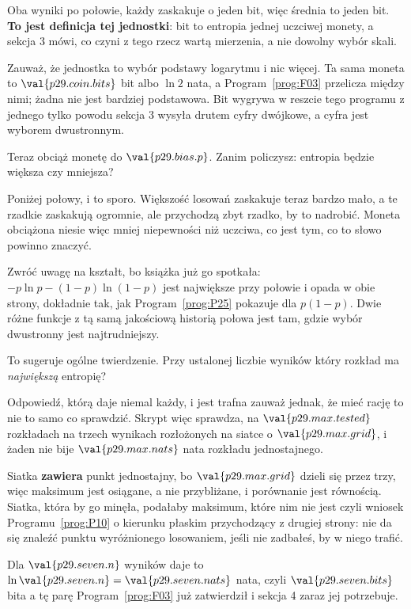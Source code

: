 \begin{fr}

Oba wyniki po połowie, każdy zaskakuje o jeden bit, więc średnia to jeden bit.
\textbf{To jest definicja tej jednostki}: bit to entropia jednej uczciwej
monety, a sekcja 3 mówi, co czyni z tego rzecz wartą mierzenia, a nie dowolny
wybór skali.

Zauważ, że jednostka to wybór podstawy logarytmu i nic więcej. Ta sama moneta
to $\val{p29.coin.bits}$ bit albo $\ln 2$ nata, a Program~\ref{prog:F03}
przelicza między nimi; żadna nie jest bardziej podstawowa. Bit wygrywa w
reszcie tego programu z jednego tylko powodu \dash{} sekcja 3 wysyła drutem
cyfry dwójkowe, a cyfra jest wyborem dwustronnym.

Teraz obciąż monetę do $\val{p29.bias.p}$. Zanim policzysz: entropia będzie
większa czy mniejsza?
\dotline
\nextframe
\end{fr}

\begin{fr}

Poniżej połowy, i to sporo. Większość losowań zaskakuje teraz bardzo mało, a
te rzadkie zaskakują ogromnie, ale przychodzą zbyt rzadko, by to nadrobić.
Moneta obciążona niesie więc mniej niepewności niż uczciwa, co jest tym, co to
słowo powinno znaczyć.

Zwróć uwagę na kształt, bo książka już go spotkała:
$-p\ln p - (1-p)\ln(1-p)$ jest największe przy połowie i opada w obie strony,
dokładnie tak, jak Program~\ref{prog:P25} pokazuje dla $p(1-p)$. Dwie różne
funkcje z tą samą
jakościową historią \dash{} połowa jest tam, gdzie wybór dwustronny jest
najtrudniejszy.

To sugeruje ogólne twierdzenie. Przy ustalonej liczbie wyników który rozkład
ma \emph{największą} entropię?
\dotline
\nextframe
\end{fr}

\begin{fr}

Odpowiedź, którą daje niemal każdy, i jest trafna \dash{} zauważ jednak, że
mieć rację to nie to samo co sprawdzić. Skrypt więc sprawdza, na
$\val{p29.max.tested}$ rozkładach na trzech wynikach rozłożonych na siatce o
$\val{p29.max.grid}$, i żaden nie bije $\val{p29.max.nats}$ nata rozkładu
jednostajnego.

\begin{note}
Siatka \textbf{zawiera} punkt jednostajny, bo $\val{p29.max.grid}$ dzieli się
przez trzy, więc maksimum jest osiągane, a nie przybliżane, i porównanie jest
równością. Siatka, która by go minęła, podałaby maksimum, które nim nie jest
\dash{} czyli wniosek Programu~\ref{prog:P10} o kierunku płaskim przychodzący
z drugiej strony: nie da się znaleźć punktu wyróżnionego losowaniem, jeśli nie
zadbałeś, by w niego trafić.
\end{note}

Dla $\val{p29.seven.n}$ wyników daje to
$\ln \val{p29.seven.n} = \val{p29.seven.nats}$ nata, czyli
$\val{p29.seven.bits}$ bita \dash{} a tę parę Program~\ref{prog:F03} już
zatwierdził i sekcja 4 zaraz jej potrzebuje.
\end{fr}

